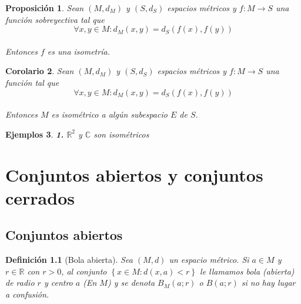 \documentclass[oneside]{book} %
\theoremstyle{Teorema}
\newtheorem{Definicion}{Definición}[chapter]
\newtheorem{Corolario}[Definicion]{Corolario}
\newtheorem{Proposicion}[Definicion]{Proposición}
\theoremstyle{Ejemplos}
\newtheorem{Ejemplos}[Definicion]{Ejemplos}
\theoremstyle{[Obs]}
\renewcommand{\{}{\left\lbrace} %
\renewcommand{\}}{\right\rbrace} %
\newcommand{\R}{\mathbb{R}} %
\newcommand{\C}{\mathbb{C}} %
\newcommand{\Ri}[1]{\mathbb{R}^{#1}} %
\begin{document}
			\begin{Proposicion}
				
				Sean $(M, d_M)$ y $(S, d_S)$ espacios métricos y $f : M \to S$ una función sobreyectiva tal que \\

				\[ \forall x, y \in M : d_M(x, y) = d_S(f(x), f(y)) \] \\

				Entonces $f$ es una isometría. \\

			\end{Proposicion}

			\begin{Corolario}
				
				Sean $(M, d_M)$ y $(S, d_S)$ espacios métricos y $f : M \to S$ una función tal que \\

				\[ \forall x, y \in M : d_M(x, y) = d_S(f(x), f(y)) \] \\

				Entonces $M$ es isométrico a algún subespacio $E$ de $S$. \\

			\end{Corolario}

			\begin{Ejemplos}

				\hfill
				
				\textbf{1.} $\Ri{2}$ y $\C$ son isométricos \\

			\end{Ejemplos}

	\chapter{Conjuntos abiertos y conjuntos cerrados}

		\section{Conjuntos abiertos}

			\begin{Definicion}[Bola abierta]
				
				Sea $(M, d)$ un espacio métrico. Si $a \in M$ y $r \in \R$ con $r > 0$, al conjunto $\{ x \in M : d(x, a) < r \}$ le llamamos bola (abierta) de radio $r$ y centro $a$ (En $M$) y se denota $B_M(a;r)$ o $B(a;r)$ si no hay lugar a confusión. \\

			\end{Definicion}
\end{document}
